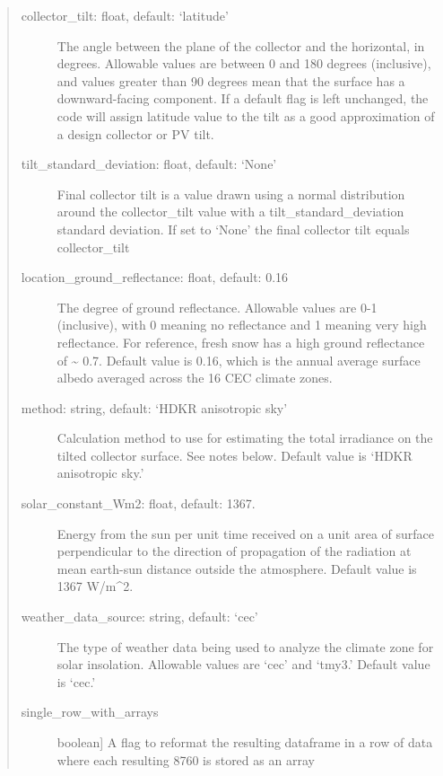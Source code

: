 \documentclass[letterpaper,10pt,english,openany]{sphinxmanual}
\begin{document}
\begin{fulllineitems}
\begin{fulllineitems}
\begin{quote}
\begin{description}
\item[{collector\_tilt: float, default: ‘latitude’}] \leavevmode
The angle between the plane of the collector and the
horizontal, in degrees.  Allowable values are between
0 and 180 degrees (inclusive), and values greater than
90 degrees mean that the surface has a downward-facing
component. If a default flag is left unchanged, the code
will assign latitude value to the tilt as a good
approximation of a design collector or PV tilt.

\item[{tilt\_standard\_deviation: float, default: ‘None’}] \leavevmode
Final collector tilt is a value drawn using a normal
distribution around the collector\_tilt value
with a tilt\_standard\_deviation standard deviation.
If set to ‘None’ the final collector tilt
equals collector\_tilt

\item[{location\_ground\_reflectance: float, default: 0.16}] \leavevmode
The degree of ground reflectance.  Allowable
values are 0-1 (inclusive), with 0 meaning
no reflectance and 1 meaning very high
reflectance.  For reference, fresh snow has
a high ground reflectance of \textasciitilde{} 0.7.  Default
value is 0.16, which is the annual average surface
albedo averaged across the 16 CEC climate zones.

\item[{method: string, default: ‘HDKR anisotropic sky’}] \leavevmode
Calculation method to use for estimating the total irradiance
on the tilted collector surface. See notes below. Default
value is ‘HDKR anisotropic sky.’

\item[{solar\_constant\_Wm2: float, default: 1367.}] \leavevmode
Energy from the sun per unit time received on a unit
area of surface perpendicular to the direction of
propagation of the radiation at mean earth-sun distance
outside the atmosphere.  Default value is 1367 W/m\textasciicircum{}2.

\item[{weather\_data\_source: string, default: ‘cec’}] \leavevmode
The type of weather data being used to analyze the
climate zone for solar insolation.  Allowable values
are ‘cec’ and ‘tmy3.’  Default value is ‘cec.’

\item[{single\_row\_with\_arrays}] \leavevmode{[}boolean{]}
A flag to reformat the resulting dataframe in a row
of data where each resulting 8760 is stored as an
array

\end{description}
\end{quote}


\end{fulllineitems}
\end{fulllineitems}
\end{document}
